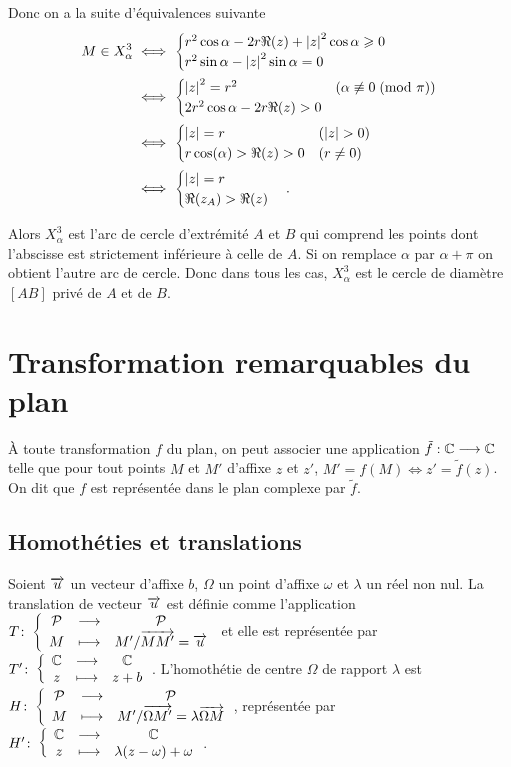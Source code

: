Donc on a la suite d'équivalences suivante
\begin{align}
  M \in X_{\alpha}^3 
  & \iff 
  \begin{cases}
    r^2\cos \alpha - 2r\Re(z) + \left\lvert z\right\rvert^2\cos \alpha \geqslant 0 \\ 
    r^2\sin \alpha - \left\lvert z\right\rvert^2\sin \alpha = 0
  \end{cases}\\
  & \iff
  \begin{cases}
    \left\lvert z\right\rvert^2 = r^2 & (\alpha \not\equiv 0\!\pmod {\pi}) \\ 
    2r^2\cos \alpha - 2r \Re(z)>0&
  \end{cases}\\
  & \iff
  \begin{cases}
    \left\lvert z\right\rvert = r & (\left\lvert z\right\rvert>0)\\ r\cos(\alpha) > \Re(z)>0 & 
    (r\neq 0)
  \end{cases}\\
  & \iff
  \begin{cases}
    \left\lvert z\right\rvert = r \\ \Re(z_A) > \Re(z)
  \end{cases}.
\end{align}

Alors \(X_{\alpha}^{3}\) est l'arc de cercle d'extrémité \(A\) et \(B\) qui 
comprend les points dont l'abscisse est strictement inférieure à celle de 
\(A\).  Si on remplace \(\alpha\) par \(\alpha + \pi\) on obtient l'autre 
arc de cercle.  Donc dans tous les cas, \(X_{\alpha}^3\) est le cercle de 
diamètre \([AB]\) privé de \(A\) et de \(B\).

\section{Transformation remarquables du plan}

À toute transformation \(f\) du plan, on peut associer une application 
\(\tilde{f} : \mathbb{C} \longrightarrow \mathbb{C}\) telle que pour tout points \(M\) et 
\(M'\) d'affixe \(z\) et \(z'\), \(M' = f(M) \iff z' = \tilde{f}(z)\). On 
dit que \(f\) est représentée dans le plan complexe par \(\tilde{f}\).

\subsection{Homothéties et translations}

\begin{defdef}
  Soient \(\overrightarrow{u}\) un vecteur d'affixe \(b\), \(\Omega\) un point d'affixe 
  \(\omega\) et \(\lambda\) un réel non nul. La translation de vecteur 
  \(\overrightarrow{u}\) est définie comme l'application \(T\colon \left\{\begin{array}{ccc} \mathcal{P} & \longrightarrow &\mathcal{P}\\ M & \longmapsto & M' / 
  \overrightarrow{MM'} = \overrightarrow{u} \end{array} \right.\) et elle est représentée par 
  \(T'\colon \left\{\begin{array}{ccc} \mathbb{C} & \longrightarrow &\mathbb{C}\\ z & \longmapsto & z + b \end{array} \right.\).  L'homothétie de centre \(\Omega\) de 
  rapport \(\lambda\) est \(H\colon \left\{\begin{array}{ccc} \mathcal{P} & \longrightarrow &\mathcal{P}\\ M & \longmapsto & M' / \overrightarrow{\Omega M'} = 
  \lambda \overrightarrow{\Omega M} \end{array} \right.\), représentée par 
  \(H'\colon \left\{\begin{array}{ccc} \mathbb{C} & \longrightarrow &\mathbb{C}\\ z & \longmapsto & \lambda(z - \omega) + \omega \end{array} \right.\).
\end{defdef}

